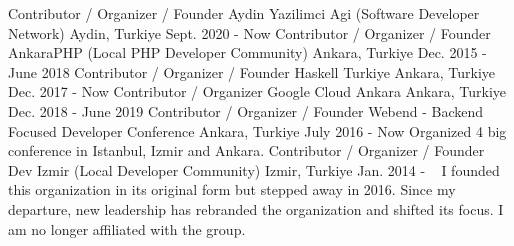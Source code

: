 \newpage

\begin{cventries}

    \cventry
    {Contributor / Organizer / Founder} %
    {Aydin Yazilimci Agi (Software Developer Network)} %
    {Aydin, Turkiye} %
    {Sept. 2020 - Now} %
    {}
    \vspace{0.5cm}
    \cventry
    {Contributor / Organizer / Founder} %
    {AnkaraPHP (Local PHP Developer Community)} %
    {Ankara, Turkiye} %
    {Dec. 2015 - June 2018} %
    {}
    \vspace{0.5cm}
    \cventry
    {Contributor / Organizer / Founder} %
    {Haskell Turkiye} %
    {Ankara, Turkiye} %
    {Dec. 2017 - Now} %
    {}
    \vspace{0.5cm}
    \cventry
    {Contributor / Organizer } %
    {Google Cloud Ankara} %
    {Ankara, Turkiye} %
    {Dec. 2018 - June 2019} %
    {}
    \vspace{0.5cm}
    \cventry
    {Contributor / Organizer / Founder} %
    {Webend - Backend Focused Developer Conference} %
    {Ankara, Turkiye} %
    {July 2016 - Now} %
    {
      Organized 4 big conference in Istanbul, Izmir and Ankara. 
    }
    \vspace{0.5cm}
    \cventry
    {Contributor / Organizer / Founder} %
    {Dev Izmir (Local Developer Community)} %
    {Izmir, Turkiye} %
    {Jan. 2014 - ~} %
    {
I founded this organization in its original form but stepped away in 2016. Since my departure, new leadership has rebranded the organization and shifted its focus. I am no longer affiliated with the group.
}
\end{cventries}
